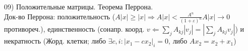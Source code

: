 09) Положительные матрицы. Теорема Перрона.\\

Док-во Перрона: положительность ($ A|x| \ge |x| \Rightarrow A|x| < \frac{A^n}{(1+\varepsilon)^n}A|x| \to 0$ противореч.), единственность (сонапр. коорд. $v \Leftarrow \sum\limits_{j} A_{kj} |v_j| = |\sum\limits_{j} A_{kj} v_j| $) и некратность (Жорд. клетки; либо $\exists c, i: |x_1 - c x_2|_i = 0$, либо $ A x_2 = x_2 + x_1 $)\\
